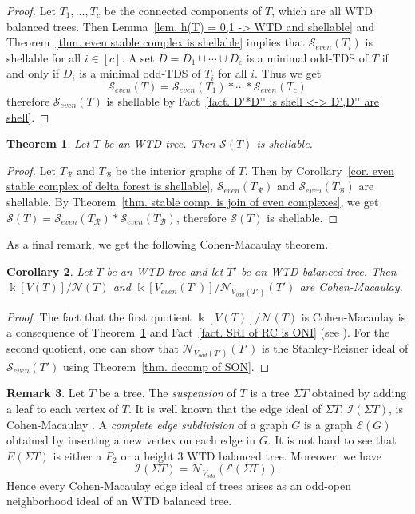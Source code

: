 \documentclass[12pt, reqno]{amsart}
\theoremstyle{definition}
\theoremstyle{plain}
\newtheorem{theorem}{Theorem}[subsection]
\newtheorem{corollary}[theorem]{Corollary}
\theoremstyle{definition}
\newtheorem{remarkn}[theorem]{Remark}
\newcommand{\R}{\mathcal{R}}
\newcommand{\B}{\mathcal{B}}
\newcommand{\kk}{\Bbbk}
\newcommand{\NN}{\mathcal{N}}
\newcommand{\II}{\mathcal{I}}
\newcommand{\calS}{\mathcal{S}}
\begin{document}
\begin{proof}
    Let $T_1,\dots,T_c$ be the connected components of $T$, which are all WTD balanced trees.
    Then Lemma~\ref{lem. h(T) = 0,1 -> WTD and shellable} and Theorem~\ref{thm. even stable complex is shellable} implies that $\calS_{even}(T_i)$ is shellable for all $i \in [c]$.
    A set $D = D_1 \cup \cdots \cup D_c$ is a minimal odd-TDS of $T$ if and only if $D_i$ is a minimal odd-TDS of $T_i$ for all $i$. 
    Thus we get
    $$
    \calS_{even}(T) = \calS_{even}(T_1) * \cdots * \calS_{even}(T_c)
    $$
    therefore $\calS_{even}(T)$ is shellable by Fact~\ref{fact. D'*D'' is shell <->  D',D'' are shell}.
\end{proof}

\begin{theorem}\label{thm. stable complex is shellable}
    Let $T$ be an WTD tree.
    Then $\calS(T)$ is shellable.
\end{theorem}

\begin{proof}
    Let $T_\R$ and $T_\B$ be the interior graphs of $T$.
    Then by Corollary~\ref{cor. even stable complex of delta forest is shellable}, $\calS_{even}(T_\R)$ and $\calS_{even}(T_\B)$ are shellable.
    By Theorem~\ref{thm. stable comp. is join of even complexes}, we get $\calS(T) = \calS_{even}(T_\R) *\calS_{even}(T_\B)$, therefore $\calS(T)$ is shellable.
\end{proof}

As a final remark, we get the following Cohen-Macaulay theorem.

\begin{corollary}\label{cor. CM of ONI and SON}
    Let $T$ be an WTD tree and let $T'$ be an WTD balanced tree.
    Then $\kk[V(T)]/\NN(T)$ and $\kk[V_{even}(T')]/\NN_{V_{odd}(T')}(T')$ are Cohen-Macaulay.
\end{corollary}

\begin{proof}
    The fact that the first quotient $\kk[V(T)]/\NN(T)$ is Cohen-Macaulay is a consequence of Theorem~\ref{thm. stable complex is shellable} and Fact~\ref{fact. SRI of RC is ONI} (see \cite[Theorem 5.1.13]{MR1251956}).
    For the second quotient, one can show that $\NN_{V_{odd}(T')}(T')$ is the Stanley-Reisner ideal of $\calS_{even}(T')$ using Theorem~\ref{thm. decomp of SON}.
\end{proof}

\begin{remarkn}
    Let $T$ be a tree.
    The \emph{suspension} of $T$ is a tree $\Sigma T$ obtained by adding a leaf to each vertex of $T$.
    It is well known that the edge ideal of $\Sigma T$, $\II(\Sigma T)$, is Cohen-Macaulay \cite{MR1031197}.
    A \emph{complete edge subdivision} of a graph $G$ is a graph $\mathcal{E}(G)$ obtained by inserting a new vertex on each edge in $G$.
    It is not hard to see that $E(\Sigma T)$ is either a $P_2$ or a height 3 WTD balanced tree.
    Moreover, we have
    $$
    \II(\Sigma T) = \NN_{V_{odd}}(\mathcal{E}(\Sigma T)).
    $$
    Hence every Cohen-Macaulay edge ideal of trees arises as an odd-open neighborhood ideal of an WTD balanced tree. 
\end{remarkn}
\end{document}
